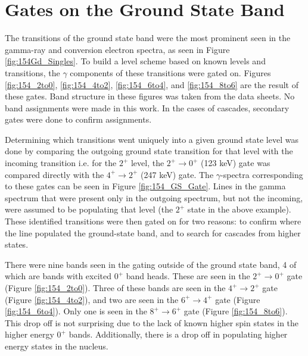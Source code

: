 \afterpage{\clearpage}

\section{Gates on the Ground State Band}
\label{sec:154GS_Gates}

The transitions of the ground state band were the most prominent seen in the gamma-ray and conversion electron spectra, as seen in Figure \ref{fig:154Gd_Singles}. To build a level scheme based on known levels and transitions, the $\gamma$ components of these transitions were gated on. Figures \ref{fig:154_2to0}, \ref{fig:154_4to2}, \ref{fig:154_6to4}, and \ref{fig:154_8to6} are the result of these gates. Band structure in these figures was taken from the data sheets. No band assignments were made in this work. In the cases of cascades, secondary gates were done to confirm assignments.

Determining which transitions went uniquely into a given ground state level was done by comparing the outgoing ground state transition for that level with the incoming transition i.e. for the $2^+$ level, the $2^+\rightarrow0^+$ (123 keV) gate was compared directly with the $4^+\rightarrow2^+$ (247 keV) gate. The $\gamma$-spectra corresponding to these gates can be seen in Figure \ref{fig:154_GS_Gate}. Lines in the gamma spectrum that were present only in the outgoing spectrum, but not the incoming, were assumed to be populating that level (the $2^+$ state in the above example). These identified transitions were then gated on for two reasons: to confirm where the line populated the ground-state band, and to search for cascades from higher states.



There were nine bands seen in the gating outside of the ground state band, 4 of which are bands with excited $0^+$ band heads. These are seen in the $2^+\rightarrow0^+$ gate (Figure \ref{fig:154_2to0}). Three of these bands are seen in the $4^+\rightarrow2^+$ gate (Figure \ref{fig:154_4to2}), and two are seen in the $6^+\rightarrow4^+$ gate (Figure \ref{fig:154_6to4}). Only one is seen in the $8^+\rightarrow6^+$ gate (Figure \ref{fig:154_8to6}). This drop off is not surprising due to the lack of known higher spin states in the higher energy $0^+$ bands. Additionally, there is a drop off in populating higher energy states in the nucleus.



